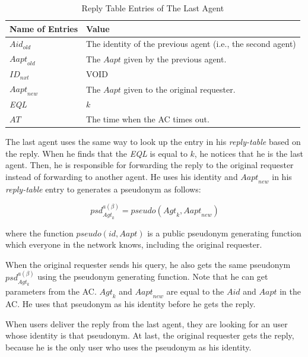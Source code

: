 \begin{table} [hbtp]
\caption{Reply Table Entries of The Last Agent}
\label{table:RTELastAgt}
\centering
\tabulinesep=2mm
\begin{tabu} to 135 mm {|X[1,c]|X[3,l]|} \hline 
Name of Entries & Value \\ \hline 
${Aid}_{old}$ & The identity of the previous agent (i.e., the second agent) \\ \hline 
${Aapt}_{old}$ & The $Aapt$ given by the previous agent. \\ \hline 
${ID}_{nxt}$ & VOID \\ \hline 
${Aapt}_{new}$ & The $Aapt$ given to the original requester. \\ \hline 
\textit{EQL} & $k$ \\ \hline 
$AT$ & The time when the AC times out. \\ \hline 
\end{tabu}
\end{table}

The last agent uses the same way to look up the entry in his \textit{reply-table} based on the reply. When he finds that the \textit{EQL} is equal to $k$, he notices that he is the last agent. Then, he is responsible for forwarding the reply to the original requester instead of forwarding to another agent. He uses his identity and ${Aapt}_{new}$ in his \textit{reply-table} entry to generates a pseudonym as follows:

\begin{equation} \label{GrindEQ__ACPPsd} 
{psd}_{{Agt}_k}^{a\left( \beta \right)}=pseudo\left({Agt}_k,{Aapt}_{new}\right)
\end{equation}

where the function $pseudo\left(id,Aapt\right)$ is a public pseudonym generating function which everyone in the network knows, including the original requester.

When the original requester sends his query, he also gets the same pseudonym ${psd}_{{Agt}_k}^{a\left( \beta \right)}$ using the pseudonym generating function. Note that he can get parameters from the AC. ${Agt}_k$ and ${Aapt}_{new}$ are equal to the $Aid$ and $Aapt$ in the AC. He uses that pseudonym as his identity before he gets the reply.

When users deliver the reply from the last agent, they are looking for an user whose identity is that pseudonym. At last, the original requester gets the reply, because he is the only user who uses the pseudonym as his identity.

